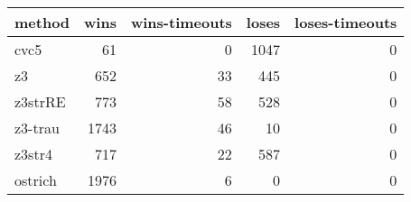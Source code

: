 \begin{tabular}{lrrrr}
\hline
 method   &   wins &   wins-timeouts &   loses &   loses-timeouts \\
\hline
 cvc5     &     61 &               0 &    1047 &                0 \\
 z3       &    652 &              33 &     445 &                0 \\
 z3strRE  &    773 &              58 &     528 &                0 \\
 z3-trau  &   1743 &              46 &      10 &                0 \\
 z3str4   &    717 &              22 &     587 &                0 \\
 ostrich  &   1976 &               6 &       0 &                0 \\
\hline
\end{tabular}
